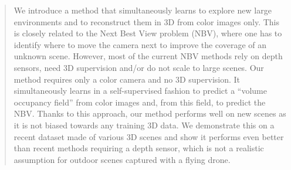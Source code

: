\begin{abstract}
We introduce a method that simultaneously learns to explore new large environments and to reconstruct them in 3D from color images only. This is closely related to the Next Best View problem (NBV), where one has to identify where to move the camera next to improve the coverage of an unknown scene. However, most of the current NBV methods rely on depth sensors, need 3D supervision and/or do not scale to large scenes. Our method requires only a color camera and no 3D supervision. It simultaneously learns in a self-supervised fashion to predict a ``volume occupancy field'' from color images and, from this field, to predict the NBV. Thanks to this approach, our method performs well on new scenes as it is not biased towards any training 3D data. We demonstrate this on a recent dataset made of various 3D scenes and show it performs even better than recent methods requiring a depth sensor, which is not a realistic assumption for outdoor scenes captured with a flying drone.
\end{abstract}
